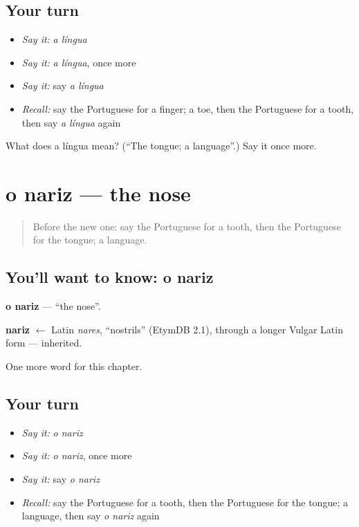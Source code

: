 \subsection*{Your turn}
\begin{itemize}
\raggedright
  \item \emph{Say it:} \emph{a língua}
  \item \emph{Say it:} \emph{a língua}, once more
  \item \emph{Say it:} say \emph{a língua}
  \item \emph{Recall:} say the Portuguese for a finger; a toe, then the Portuguese for a tooth, then say \emph{a língua} again
\end{itemize}

\begin{tcolorbox}[breakable,colback=teal!4,colframe=teal!35!black,title={Before you move on}]
What does a língua mean? (\textquotedblleft{}The tongue; a language\textquotedblright{}.) Say it once more.
\end{tcolorbox}
\section[o nariz]{o nariz — the nose}

\label{lesson:PT-C31-nariz}



\begin{quote}
Before the new one: say the Portuguese for a tooth, then the Portuguese for the tongue; a language.
\end{quote}

\subsection*{You'll want to know: o nariz}
\textbf{o nariz} — \textquotedblleft{}the nose\textquotedblright{}.

\begin{cousinweb}
\textbf{nariz} $\leftarrow$ Latin \emph{nares}, \textquotedblleft{}nostrils\textquotedblright{} (EtymDB 2.1), through a longer Vulgar Latin form — inherited.
\end{cousinweb}

\begin{grammarlens}[title={What you've built}]
One more word for this chapter.
\end{grammarlens}

\subsection*{Your turn}
\begin{itemize}
\raggedright
  \item \emph{Say it:} \emph{o nariz}
  \item \emph{Say it:} \emph{o nariz}, once more
  \item \emph{Say it:} say \emph{o nariz}
  \item \emph{Recall:} say the Portuguese for a tooth, then the Portuguese for the tongue; a language, then say \emph{o nariz} again
\end{itemize}

